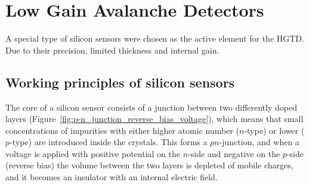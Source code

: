 


\section{Low Gain Avalanche Detectors}\label{sec:LGADs}


A special type of silicon sensors were chosen as the active element for the HGTD. Due to their precision, limited thickness and internal gain.

\subsection{Working principles of silicon sensors}

The core of a silicon sensor consists of a junction between two differently doped layers (Figure~\ref{fig:p-n_junction_reverse_bias_voltage}), which means that small concentrations of impurities with either higher atomic number ($n$-type) or lower ($p$-type) are introduced inside the crystals.
This forms a $pn$-junction, and when a voltage is applied with positive potential on the $n$-side and negative on the $p$-side (reverse bias) the volume between the two layers is depleted of mobile charges, and it becomes an insulator with an internal electric field.

